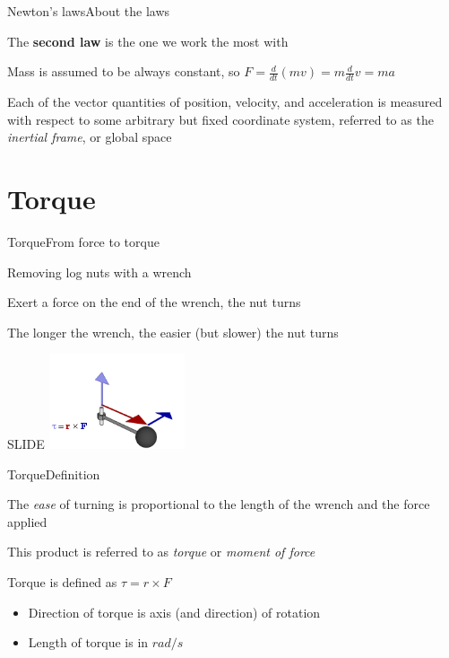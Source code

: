 \documentclass{beamer}
\begin{document}

\begin{slide}{Newton's laws}{About the laws}{
\item The \textbf{second law} is the one we work the most with
\item Mass is assumed to be always constant, so $F=\frac{d}{dt}(mv) = m\frac{d}{dt}v = ma$
\item Each of the vector quantities of position, velocity, and acceleration is measured with respect to some arbitrary but fixed coordinate system, referred to as the \textit{inertial frame}, or global space
}\end{slide}

\section{Torque}
\begin{slide}{Torque}{From force to torque}{
\item Removing log nuts with a wrench
\item Exert a force on the end of the wrench, the nut turns
\item The longer the wrench, the easier (but slower) the nut turns
}\end{slide}

\begin{frame}{SLIDE}
\center
\includegraphics[width=4cm]{Pics/Torque_animation.png}
\end{frame}

\begin{slide}{Torque}{Definition}{
\item The \textit{ease} of turning is proportional to the length of the wrench and the force applied
\item This product is referred to as \textit{torque} or \textit{moment of force}
\item Torque is defined as $\tau = r \times F$
\begin{itemize}
\item Direction of torque is axis (and direction) of rotation
\item Length of torque is in $rad/s$
\end{itemize}
}\end{slide}
\end{document}
